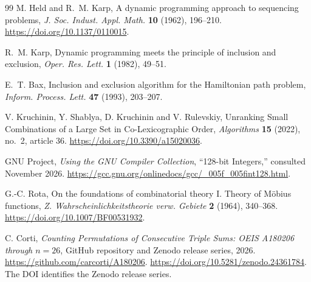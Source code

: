 \documentclass[11pt]{article}
\begin{document}
\begin{thebibliography}{99}
M. Held and R.~M. Karp, A dynamic programming approach to sequencing
problems, \emph{J. Soc. Indust. Appl. Math.} \textbf{10} (1962), 196--210.
\url{https://doi.org/10.1137/0110015}.

R.~M. Karp, Dynamic programming meets the principle of inclusion and
exclusion, \emph{Oper. Res. Lett.} \textbf{1} (1982), 49--51.

E.~T. Bax, Inclusion and exclusion algorithm for the Hamiltonian path
problem, \emph{Inform. Process. Lett.} \textbf{47} (1993), 203--207.

V. Kruchinin, Y. Shablya, D. Kruchinin and V. Rulevskiy,
Unranking Small Combinations of a Large Set in Co-Lexicographic Order,
\emph{Algorithms} \textbf{15} (2022), no.~2, article 36.
\url{https://doi.org/10.3390/a15020036}.

GNU Project, \emph{Using the GNU Compiler Collection}, ``128-bit Integers,''
consulted November 2026.
\url{https://gcc.gnu.org/onlinedocs/gcc/_005f_005fint128.html}.

G.-C. Rota, On the foundations of combinatorial theory I. Theory of
M\"obius functions, \emph{Z. Wahrscheinlichkeitstheorie verw. Gebiete}
\textbf{2} (1964), 340--368.
\url{https://doi.org/10.1007/BF00531932}.

C. Corti, \emph{Counting Permutations of Consecutive Triple Sums:
OEIS A180206 through \(n=26\)}, GitHub repository and Zenodo release series, 2026.
\url{https://github.com/carcorti/A180206}.
\url{https://doi.org/10.5281/zenodo.24361784}.
The DOI identifies the Zenodo release series.
\end{thebibliography}
\end{document}
